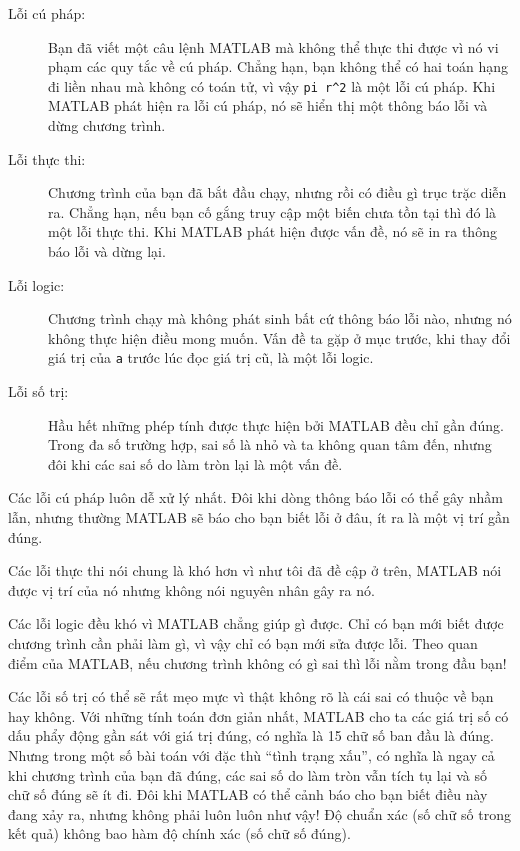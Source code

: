 \documentclass[12pt]{book}
\begin{document}
\begin{description}

\item[Lỗi cú pháp:] Bạn đã viết một câu lệnh MATLAB mà không thể
thực thi được vì nó vi phạm các quy tắc về cú pháp. Chẳng hạn, bạn
không thể có hai toán hạng đi liền nhau mà không có toán tử, vì vậy
\verb+pi r^2+ là một lỗi cú pháp. Khi MATLAB phát hiện ra lỗi cú pháp,
nó sẽ hiển thị một thông báo lỗi và dừng chương trình.

\item[Lỗi thực thi:] Chương trình của bạn đã bắt đầu chạy, nhưng rồi
có điều gì trục trặc diễn ra. Chẳng hạn, nếu bạn cố gắng truy cập
một biến chưa tồn tại thì đó là một lỗi thực thi. Khi MATLAB phát hiện
được vấn đề, nó sẽ in ra thông báo lỗi và dừng lại.

\item[Lỗi logic:] Chương trình chạy mà không phát sinh bất cứ thông báo
lỗi nào, nhưng nó không thực hiện điều mong muốn. Vấn đề ta gặp ở
mục trước, khi thay đổi giá trị của {\tt a} trước lúc đọc giá trị cũ, là
một lỗi logic.

\item[Lỗi số trị:] Hầu hết những phép tính được thực hiện bởi MATLAB 
đều chỉ gần đúng. Trong đa số trường hợp, sai số là nhỏ và ta không
quan tâm đến, nhưng đôi khi các sai số do làm tròn lại là một vấn đề.

\end{description}

Các lỗi cú pháp luôn dễ xử lý nhất. Đôi khi dòng thông báo lỗi có thể
gây nhầm lẫn, nhưng thường MATLAB sẽ báo cho bạn biết lỗi ở đâu,
ít ra là một vị trí gần đúng.

Các lỗi thực thi nói chung là khó hơn vì như tôi đã đề cập ở trên, 
MATLAB nói được vị trí của nó nhưng không nói nguyên nhân gây ra nó.

Các lỗi logic đều khó vì MATLAB chẳng giúp gì được. Chỉ có bạn mới
biết được chương trình cần phải làm gì, vì vậy chỉ có bạn mới sửa được
lỗi. Theo quan điểm của MATLAB, nếu chương trình không có gì sai
thì lỗi nằm trong đầu bạn!

Các lỗi số trị có thể sẽ rất mẹo mực vì thật không rõ là cái sai có
thuộc về bạn hay không. Với những tính toán đơn giản nhất, 
MATLAB cho ta các giá trị số có dấu phẩy động gần sát với giá
trị đúng, có nghĩa là 15 chữ số ban đầu là đúng. Nhưng trong một số
bài toán với đặc thù ``tình trạng xấu'', có nghĩa là ngay cả khi 
chương trình của bạn đã đúng, các sai số do làm tròn vẫn tích tụ lại
và số chữ số đúng sẽ ít đi. Đôi khi MATLAB có thể cảnh báo cho bạn
biết điều này đang xảy ra, nhưng không phải luôn luôn như vậy! 
Độ chuẩn xác (số chữ số trong kết quả) không bao hàm độ
chính xác (số chữ số đúng).
\end{document}
